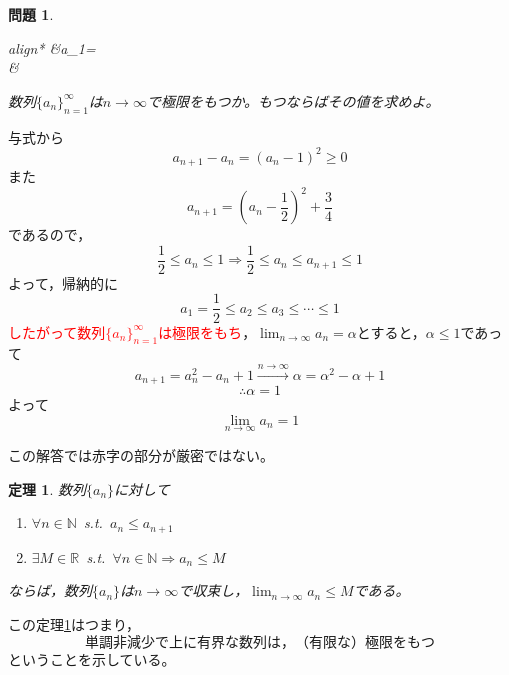 \documentclass[dvipdfmx,a4j,10pt]{jsarticle}
\makeatletter
\theoremstyle{mystyle1}
\newtheorem{thm}[dfn]{定理}
\newtheorem{qes}[dfn]{問題}
\theoremstyle{mystyle2}
\newtheorem{ans}{解答}
\renewenvironment{ans}[1][解答]{\par
  \pushQED{\qed}%
  \normalfont
  \topsep6\p@\@plus6\p@ \trivlist
  \item[\hskip\labelsep{\bfseries\sffamily #1}]\ignorespaces
}{%
  \popQED\endtrivlist\@endpefalse
}
\makeatother
\begin{document}
\begin{shaded}
	\begin{qes}\label{introq}
		\begin{empheq}[left=\empheqlbrace]{align*}
			&a_1=\\
			&
		\end{empheq}
		数列$\{a_n\}_{n=1}^\infty$は$n\to\infty$で極限をもつか。もつならばその値を求めよ。
	\end{qes}
\end{shaded}

\begin{ans}[解答? \ref{introq}]
    与式から
    \[a_{n+1}-a_n=(a_n-1)^2\geq0\]
    また
    \[a_{n+1}=\left(a_n-\frac{1}{2}\right)^2+\frac{3}{4}\]
    であるので，
    \[\frac{1}{2}\leq a_n\leq 1\Longrightarrow \frac{1}{2}\leq a_n\leq a_{n+1}\leq 1\]
    よって，帰納的に
    \[a_1=\frac{1}{2}\leq a_2\leq a_3\leq \cdots\leq 1\]
    \textcolor{red}{したがって数列$\{a_n\}_{n=1}^{\infty}$は極限をもち}，$\displaystyle \lim_{n\to\infty}a_n=\alpha$とすると，$\alpha\leq1$であって
    \[a_{n+1}=a_n^2-a_n+1\xrightarrow{n\to\infty}\alpha=\alpha^2-\alpha+1\]
    \[\therefore \alpha=1\]
    よって
    \[\lim_{n\to\infty}a_n=1\]
\end{ans}

この解答では赤字の部分が厳密ではない。

\newpage

\begin{framed}
\begin{thm}\label{thm1}
    数列$\{a_n\}$に対して
    \begin{enumerate}
    	\item $\forall n\in\mathbb{N}$\ s.t.\ $a_n\leq a_{n+1}$
    	\item $\exists M\in\mathbb{R}$\ s.t.\ $\forall n\in\mathbb{N}\Longrightarrow a_n\leq M$
    \end{enumerate}
    ならば，数列$\{a_n\}$は$n\to\infty$で収束し，$\displaystyle\lim_{n\to\infty}a_n\leq M$である。
\end{thm}

\end{framed}
この定理\ref{thm1}はつまり，
\[
    単調非減少で上に有界な数列は，（有限な）極限をもつ
\]
ということを示している。
\end{document}

